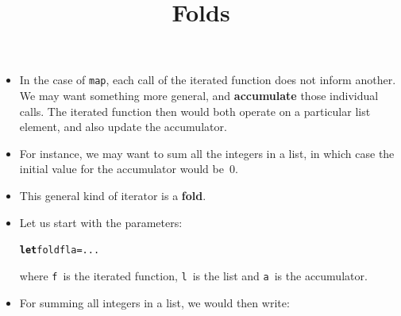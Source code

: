 \documentclass[wide]{slides}
\begin{document}
\begin{slide}
  \title{Folds}

  \begin{itemize}

    \item In the case of \texttt{map}, each call of the iterated
      function does not inform another. We may want something more
      general, and \textbf{accumulate} those individual calls. The
      iterated function then would both operate on a particular list
      element, and also update the accumulator.

    \item For instance, we may want to sum all the integers in a list,
      in which case the initial value for the accumulator would
      be~\(0\).

    \item This general kind of iterator is a \textbf{fold}.

    \item Let us start with the parameters:
      \smallskip
\begin{alltt}
\textbf{let} fold f l a = ...
\end{alltt}
      \smallskip
      \noindent where \texttt{f}~is the iterated function,
      \texttt{l}~is the list and \texttt{a}~is the accumulator.

    \item For summing all integers in a list, we would then write:

      \smallskip
      \noindent{}

      \noindent{}

  \end{itemize}

\end{slide}
\end{document}
